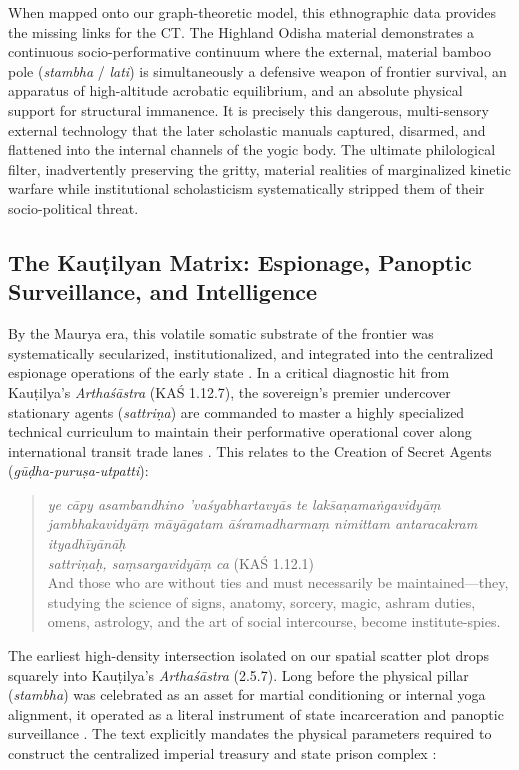 \documentclass[11pt,twoside,letterpaper]{article}
\begin{document}
When mapped onto our graph-theoretic model, this ethnographic data provides the missing links for the CT. The Highland Odisha material demonstrates a continuous socio-performative continuum where the external, material bamboo pole (\textit{stambha} / \textit{lati}) is simultaneously a defensive weapon of frontier survival, an apparatus of high-altitude acrobatic equilibrium, and an absolute physical support for structural immanence. It is precisely this dangerous, multi-sensory external technology that the later scholastic manuals captured, disarmed, and flattened into the internal channels of the yogic body. The ultimate philological filter, inadvertently preserving the gritty, material realities of marginalized kinetic warfare while institutional scholasticism systematically stripped them of their socio-political threat.

\subsection{The Kauṭilyan Matrix: Espionage, Panoptic Surveillance, and Intelligence}
By the Maurya era, this volatile somatic substrate of the frontier was systematically secularized, institutionalized, and integrated into the centralized espionage operations of the early state \citep{Kangle1969}. In a critical diagnostic hit from Kauṭilya’s \textit{Arthaśāstra} (KAŚ 1.12.7), the sovereign’s premier undercover stationary agents (\textit{sattriṇa}) are commanded to master a highly specialized technical curriculum to maintain their performative operational cover along international transit trade lanes \citep{Kangle1969}. This relates to the Creation of Secret Agents ({\textit{gūḍha-puruṣa-utpatti}}):

\begin{quote}
\textit{ye cāpy asambandhino 'vaśyabhartavyās te laks̄aṇamaṅgavidyāṃ\\
jambhakavidyāṃ māyāgatam āśramadharmaṃ nimittam antaracakram ityadhīyānāḥ\\
sattriṇaḥ, saṃsargavidyāṃ ca} (KAŚ 1.12.1)\\
And those who are without ties and must necessarily be maintained—they,
studying the science of signs, anatomy, sorcery, magic, ashram duties,
omens, astrology, and the art of social intercourse, become institute-spies. \\
\end{quote}

The earliest high-density intersection isolated on our spatial scatter plot drops squarely into Kauṭilya’s \textit{Arthaśāstra} (2.5.7). Long before the physical pillar (\textit{stambha}) was celebrated as an asset for martial conditioning or internal yoga alignment, it operated as a literal instrument of state incarceration and panoptic surveillance \citep{Kangle1969}. The text explicitly mandates the physical parameters required to construct the centralized imperial treasury and state prison complex \citep{Kangle1969}:
\end{document}
